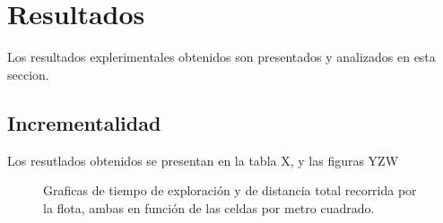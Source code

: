 \section{Resultados}
Los resultados explerimentales obtenidos son presentados y analizados en esta
seccion.
\subsection{Incrementalidad}\label{sec:exp:inc}
Los resutlados obtenidos se presentan en la tabla X, y las figuras YZW





\begin{figure}[H]
  \centerfloat


  \qquad

  \caption[Robot diferencial Pioneer 3-DX.]{Graficas de tiempo de exploración y de distancia total recorrida por la flota, ambas en función de las celdas por metro cuadrado.}\label{fig:gra:inc1}

\end{figure}

